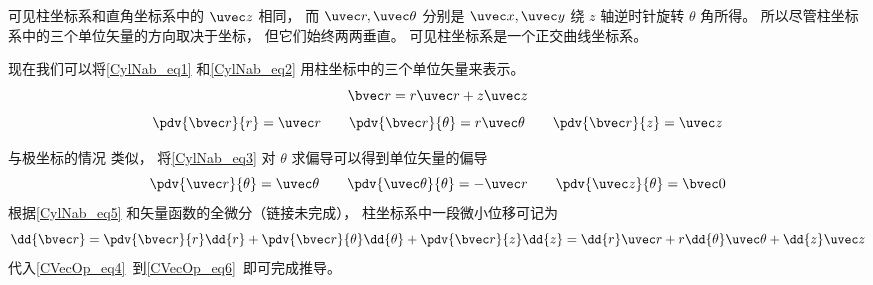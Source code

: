 可见柱坐标系和直角坐标系中的 $\uvec z$ 相同， 而 $\uvec r, \uvec \theta$ 分别是 $\uvec x, \uvec y$ 绕 $z$ 轴逆时针旋转 $\theta$ 角所得。 所以尽管柱坐标系中的三个单位矢量的方向取决于坐标， 但它们始终两两垂直。 可见柱坐标系是一个正交曲线坐标系。

现在我们可以将\autoref{CylNab_eq1} 和\autoref{CylNab_eq2} 用柱坐标中的三个单位矢量来表示。
\begin{equation}
\bvec r = r\uvec r + z\uvec z
\end{equation}
\begin{equation}\label{CylNab_eq5}
\pdv{\bvec r}{r} = \uvec r \qquad \pdv{\bvec r}{\theta} = r\uvec \theta \qquad \pdv{\bvec r}{z} = \uvec z
\end{equation}

与极坐标的情况 类似， 将\autoref{CylNab_eq3} 对 $\theta$ 求偏导可以得到单位矢量的偏导
\begin{equation}
\pdv{\uvec r}{\theta} = \uvec \theta \qquad
\pdv{\uvec \theta}{\theta} = -\uvec r \qquad
\pdv{\uvec z}{\theta} = \bvec 0
\end{equation}
根据\autoref{CylNab_eq5} 和矢量函数的全微分（链接未完成）， 柱坐标系中一段微小位移可记为
\begin{equation}\label{CylNab_eq7}
\dd{\bvec r} = \pdv{\bvec r}{r}\dd{r} + \pdv{\bvec r}{\theta}\dd{\theta} + \pdv{\bvec r}{z}\dd{z} = \dd{r}\uvec r + r\dd{\theta} \uvec \theta + \dd{z} \uvec z
\end{equation}
代入\autoref{CVecOp_eq4}~到\autoref{CVecOp_eq6}~即可完成推导。
